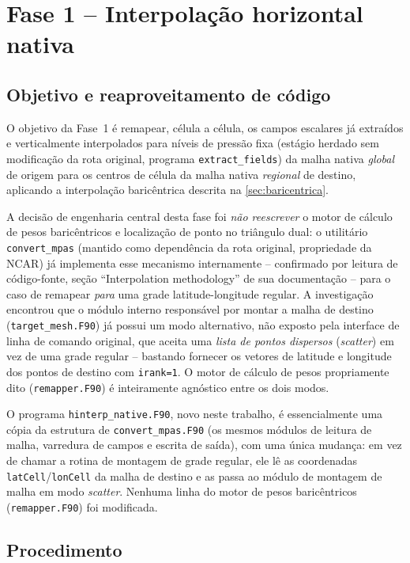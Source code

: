 \chapter{Fase 1 -- Interpolação horizontal nativa}
\label{cap:fase1}

\section{Objetivo e reaproveitamento de código}
\label{sec:fase1_reuso}

O objetivo da Fase~1 é remapear, célula a célula, os campos escalares já
extraídos e verticalmente interpolados para níveis de pressão fixa
(estágio herdado sem modificação da rota original, programa
\texttt{extract\_fields}) da malha nativa \emph{global} de origem para os
centros de célula da malha nativa \emph{regional} de destino, aplicando
a interpolação baricêntrica descrita na \cref{sec:baricentrica}.

A decisão de engenharia central desta fase foi \emph{não reescrever} o
motor de cálculo de pesos baricêntricos e localização de ponto no
triângulo dual: o utilitário \texttt{convert\_mpas} (mantido como
dependência da rota original, propriedade da NCAR) já implementa esse
mecanismo internamente -- confirmado por leitura de código-fonte,
seção ``Interpolation methodology'' de sua documentação -- para o caso
de remapear \emph{para} uma grade latitude-longitude regular. A
investigação encontrou que o módulo interno responsável por montar a
malha de destino (\texttt{target\_mesh.F90}) já possui um modo
alternativo, não exposto pela interface de linha de comando original,
que aceita uma \emph{lista de pontos dispersos} (\emph{scatter}) em vez
de uma grade regular -- bastando fornecer os vetores de latitude e
longitude dos pontos de destino com \texttt{irank=1}. O motor de cálculo
de pesos propriamente dito (\texttt{remapper.F90}) é inteiramente
agnóstico entre os dois modos.

O programa \texttt{hinterp\_native.F90}, novo neste trabalho, é
essencialmente uma cópia da estrutura de \texttt{convert\_mpas.F90} (os
mesmos módulos de leitura de malha, varredura de campos e escrita de
saída), com uma única mudança: em vez de chamar a rotina de montagem de
grade regular, ele lê as coordenadas \texttt{latCell}/\texttt{lonCell}
da malha de destino e as passa ao módulo de montagem de malha em modo
\emph{scatter}. Nenhuma linha do motor de pesos baricêntricos
(\texttt{remapper.F90}) foi modificada.

\section{Procedimento}

